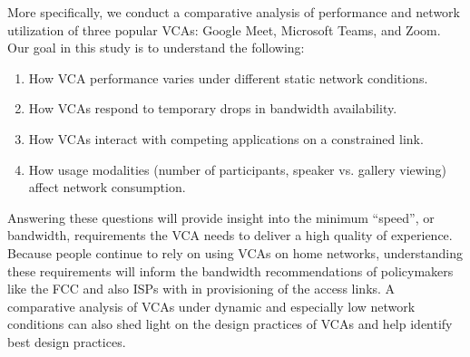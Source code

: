 More specifically, we conduct a comparative analysis of performance and network utilization of three popular VCAs: Google Meet, Microsoft Teams, and Zoom. %
Our goal in this study is to understand the following:
\begin{enumerate}[noitemsep]
    \item How VCA performance varies under different static network conditions.
    \item How VCAs respond to temporary drops in bandwidth availability.
    \item How VCAs interact with competing applications on a constrained link.
    \item How usage modalities (number of participants, speaker vs. gallery viewing) affect network consumption.
\end{enumerate}

Answering these questions will provide insight into the minimum  ``speed'', or bandwidth, requirements the VCA needs to deliver a high quality of experience. Because people continue to rely on using VCAs on home networks, understanding these requirements will inform the bandwidth recommendations of policymakers like the FCC and also ISPs with in provisioning of the access links. A comparative analysis of VCAs under dynamic and especially low network conditions can also shed light on the design practices of VCAs and help identify best design practices. %

